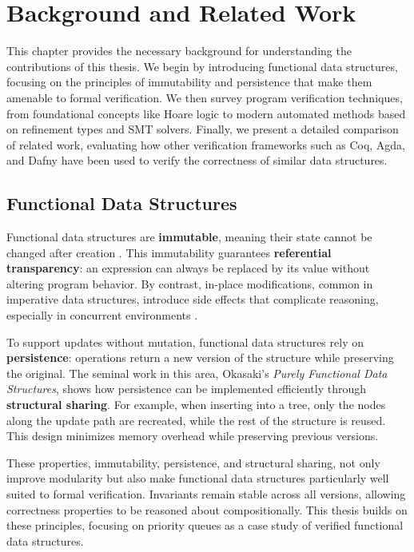 \chapter{Background and Related Work}
\label{chap:background}

This chapter provides the necessary background for understanding the contributions of this thesis.
We begin by introducing functional data structures, focusing on the principles of immutability and persistence that make them amenable to formal verification.
We then survey program verification techniques, from foundational concepts like Hoare logic to modern automated methods based on refinement types and SMT solvers.
Finally, we present a detailed comparison of related work, evaluating how other verification frameworks such as Coq, Agda, and Dafny have been used to verify the correctness of similar data structures.

\section{Functional Data Structures}

Functional data structures are \textbf{immutable}, meaning their state cannot be changed after creation \cite{okasaki}.
This immutability guarantees \textbf{referential transparency}: an expression can always be replaced by its value without altering program behavior.
By contrast, in-place modifications, common in imperative data structures, introduce side effects that complicate reasoning, especially in concurrent environments \cite{okasaki}.

To support updates without mutation, functional data structures rely on \textbf{persistence}: operations return a new version of the structure while preserving the original.
The seminal work in this area, Okasaki's \textit{Purely Functional Data Structures}, shows how persistence can be implemented efficiently through \textbf{structural sharing}.
For example, when inserting into a tree, only the nodes along the update path are recreated, while the rest of the structure is reused.
This design minimizes memory overhead while preserving previous versions.

These properties, immutability, persistence, and structural sharing, not only improve modularity but also make functional data structures particularly well suited to formal verification.
Invariants remain stable across all versions, allowing correctness properties to be reasoned about compositionally.
This thesis builds on these principles, focusing on priority queues as a case study of verified functional data structures.

